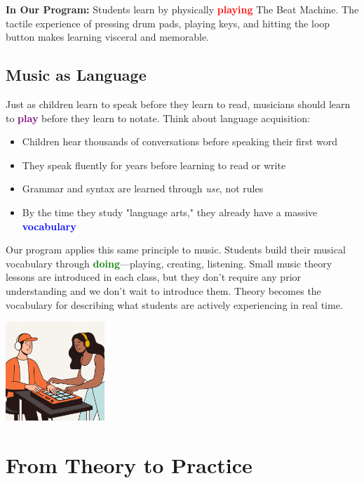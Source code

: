 \documentclass[11pt,letterpaper]{article}
\newcommand{\purple}[1]{\textcolor{purple}{\textbf{#1}}}
\newcommand{\bluepurple}[1]{\textcolor{blue}{\textbf{#1}}}
\newcommand{\greentext}[1]{\textcolor{green}{\textbf{#1}}}
\newcommand{\redtext}[1]{\textcolor{red}{\textbf{#1}}}
\begin{document}
\textbf{In Our Program:} Students learn by physically \redtext{playing} The Beat Machine. The tactile experience of pressing drum pads, playing keys, and hitting the loop button makes learning visceral and memorable.

\subsection*{Music as Language}

Just as children learn to speak before they learn to read, musicians should learn to \purple{play} before they learn to notate. Think about language acquisition:

\begin{itemize}[leftmargin=*]
\item Children hear thousands of conversations before speaking their first word
\item They speak fluently for years before learning to read or write
\item Grammar and syntax are learned through \textit{use}, not rules
\item By the time they study "language arts," they already have a massive \bluepurple{vocabulary}
\end{itemize}

Our program applies this same principle to music. Students build their musical vocabulary through \greentext{doing}—playing, creating, listening. Small music theory lessons are introduced in each class, but they don't require any prior understanding and we don't wait to introduce them. Theory becomes the vocabulary for describing what students are actively experiencing in real time.

\begin{center}
\includegraphics[width=0.28\textwidth]{Illustrations/Jamming.png}
\end{center}

\newpage

\section*{From Theory to Practice}
\end{document}
